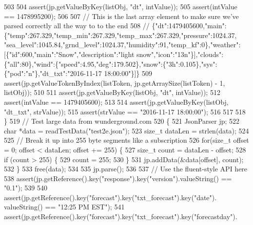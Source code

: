 \begin{DoxyCode}
{{{{{{503 
504         assert(jp.getValueByKey(listObj, \textcolor{stringliteral}{"dt"}, intValue));
505         assert(intValue == 1478995200);
506 
507         \textcolor{comment}{// This is the last array element to make sure we've parsed correctly all the way to to the end}
508         \textcolor{comment}{//
       \{"dt":1479405600,"main":\{"temp":267.329,"temp\_min":267.329,"temp\_max":267.329,"pressure":1024.37,
      "sea\_level":1045.84,"grnd\_level":1024.37,"humidity":91,"temp\_kf":0\},"weather":[\{"id":600,"main":"Snow","description":"light
       snow","icon":"13n"\}],"clouds":\{"all":80\},"wind":\{"speed":4.95,"deg":179.502\},"snow":\{"3h":0.105\},"sys":\{"pod":"n"\},"dt\_txt":"2016-11-17 18:00:00"\}]\}}
509         assert(jp.getValueTokenByIndex(listToken, jp.getArraySize(listToken) - 1, listObj));
510 
511         assert(jp.getValueByKey(listObj, \textcolor{stringliteral}{"dt"}, intValue));
512         assert(intValue == 1479405600);
513 
514         assert(jp.getValueByKey(listObj, \textcolor{stringliteral}{"dt\_txt"}, strValue));
515         assert(strValue == \textcolor{stringliteral}{"2016-11-17 18:00:00"});
516 
517 
518     \}
519     \textcolor{comment}{// Test large data from wunderground.com}
520     \{
521         JsonParser jp;
522         \textcolor{keywordtype}{char} *data = readTestData(\textcolor{stringliteral}{"test2e.json"});
523         \textcolor{keywordtype}{size\_t} dataLen = strlen(data);
524 
525         \textcolor{comment}{// Break it up into 255 byte segments like a subscription}
526         \textcolor{keywordflow}{for}(\textcolor{keywordtype}{size\_t} offset = 0; offset < dataLen; offset += 255) \{
527             \textcolor{keywordtype}{size\_t} count = dataLen - offset;
528             \textcolor{keywordflow}{if} (count > 255) \{
529                 count = 255;
530             \}
531             jp.addData(&data[offset], count);
532         \}
533         free(data);
534 
535         jp.parse();
536 
537         \textcolor{comment}{// Use the fluent-style API here}
538         assert(jp.getReference().key(\textcolor{stringliteral}{"response"}).key(\textcolor{stringliteral}{"version"}).valueString() == \textcolor{stringliteral}{"0.1"});
539 
540         assert(jp.getReference().key(\textcolor{stringliteral}{"forecast"}).key(\textcolor{stringliteral}{"txt\_forecast"}).key(\textcolor{stringliteral}{"date"}).
      valueString() == \textcolor{stringliteral}{"12:25 PM EST"});
541         assert(jp.getReference().key(\textcolor{stringliteral}{"forecast"}).key(\textcolor{stringliteral}{"txt\_forecast"}).key(\textcolor{stringliteral}{"forecastday"}).
}}}}}}
\end{DoxyCode}
